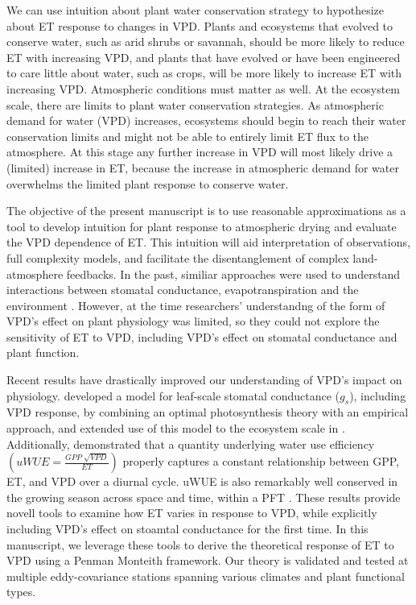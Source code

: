 \documentclass[draft,linenumbers]{agujournal}
\begin{document}
We can use intuition about plant water conservation strategy to hypothesize about ET response to changes in VPD. Plants and ecosystems that evolved to conserve water, such as arid shrubs or savannah, should be more likely to reduce ET with increasing VPD, and plants that have evolved or have been engineered to care little about water, such as crops, will be more likely to increase ET with increasing VPD. Atmospheric conditions must matter as well. At the ecosystem scale, there are limits to plant water conservation strategies. As atmospheric demand for water (VPD) increases, ecosystems should begin to reach their water conservation limits and might not be able to entirely limit ET flux to the atmosphere. At this stage any further increase in VPD will most likely drive a (limited) increase in ET, because the increase in atmospheric demand for water overwhelms the limited plant response to conserve water.

The objective of the present manuscript is to use reasonable approximations as a tool to develop intuition for plant response to atmospheric drying and evaluate the VPD dependence of ET. This intuition will aid interpretation of observations, full complexity models, and facilitate the disentanglement of complex land-atmosphere feedbacks. In the past, similiar approaches were used to understand interactions between stomatal conductance, evapotranspiration and the environment \citep[e.g.,][]{Jarvis_1986, Mcnaughton_1991}. However, at the time researchers' understandng of the form of VPD's effect on plant physiology was limited, so they could not explore the sensitivity of ET to VPD, including VPD's effect on stomatal conductance and plant function.

Recent results have drastically improved our understanding of VPD's impact on physiology. \citet{MEDLYN_2011} developed a model for leaf-scale stomatal conductance ($g_s$), including VPD response, by combining an optimal photosynthesis theory \citep{Farquhar_1980, Katul_2010} with an empirical approach, and extended use of this model to the ecosystem scale in \citet{Medlyn_2017}. Additionally, \citet{Zhou_2014} demonstrated that a quantity underlying water use efficiency $\left(uWUE = \frac{GPP\; \sqrt{VPD}}{ET}\right)$ properly captures a constant relationship between GPP, ET, and VPD over a diurnal cycle. uWUE is also remarkably well conserved in the growing season across space and time, within a PFT \citep{Zhou_2015}. These results provide novell tools to examine how ET varies in response to VPD, while explicitly including VPD's effect on stoamtal conductance for the first time. In this manuscript, we leverage these tools to derive the theoretical response of ET to VPD using a Penman Monteith framework. Our theory is validated and tested at multiple eddy-covariance stations spanning various climates and plant functional types. 
\end{document}

